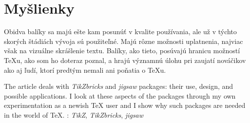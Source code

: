 \documentclass{csbulletin}
\newcommand\TikZ{Ti\textit{k}Z}
\begin{document}
\vspace*{-0.2cm}

\section{Myšlienky}
Obidva balíky sa majú ešte kam posunúť v kvalite používania, ale už v týchto skorých štádiách vývoja sú použiteľné. Majú rôzne možnosti uplatnenia, najviac však na vizuálne skrášlenie textu.
Balíky, ako tieto, posúvajú hranicu možností \TeX u, ako som ho doteraz poznal, a hrajú významnú úlohu pri zaujatí nováčikov ako aj ľudí, ktorí predtým nemali ani poňatia o \TeX u.

\vspace*{-0.2cm}

\begingroup
\sloppy
\printbibliography
\endgroup

\begin{summary}
The article deals with \emph{\TikZ bricks} and \emph{jigsaw} packages: their use, design, and possible applications. I look at these aspects of the packages through my own experimentation as a newish \TeX{} user and I show why such packages are needed in the world of \TeX.
\keywords: \emph{\TikZ}, \emph{\TikZ bricks}, \emph{jigsaw}
\end{summary}
\end{document}
